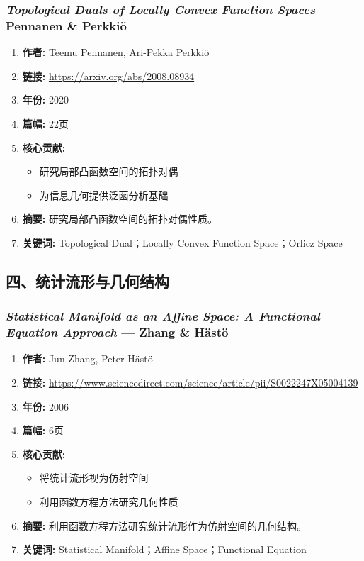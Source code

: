 \subsubsection{\textbf{\textit{Topological Duals of Locally Convex Function Spaces}} — Pennanen \& Perkkiö}
\begin{enumerate}
    \item \textbf{作者:} Teemu Pennanen, Ari-Pekka Perkkiö
    \item \textbf{链接:} \url{https://arxiv.org/abs/2008.08934}
    \item \textbf{年份:} 2020
    \item \textbf{篇幅:} 22页
    \item \textbf{核心贡献:}
        \begin{itemize}
            \item 研究局部凸函数空间的拓扑对偶
            \item 为信息几何提供泛函分析基础
        \end{itemize}
    \item \textbf{摘要:} 研究局部凸函数空间的拓扑对偶性质。
    \item \textbf{关键词:} Topological Dual；Locally Convex Function Space；Orlicz Space
\end{enumerate}

\subsection{四、统计流形与几何结构}

\subsubsection{\textbf{\textit{Statistical Manifold as an Affine Space: A Functional Equation Approach}} — Zhang \& Hästö}
\begin{enumerate}
    \item \textbf{作者:} Jun Zhang, Peter Hästö
    \item \textbf{链接:} \url{https://www.sciencedirect.com/science/article/pii/S0022247X05004139}
    \item \textbf{年份:} 2006
    \item \textbf{篇幅:} 6页
    \item \textbf{核心贡献:}
        \begin{itemize}
            \item 将统计流形视为仿射空间
            \item 利用函数方程方法研究几何性质
        \end{itemize}
    \item \textbf{摘要:} 利用函数方程方法研究统计流形作为仿射空间的几何结构。
    \item \textbf{关键词:} Statistical Manifold；Affine Space；Functional Equation
\end{enumerate}

